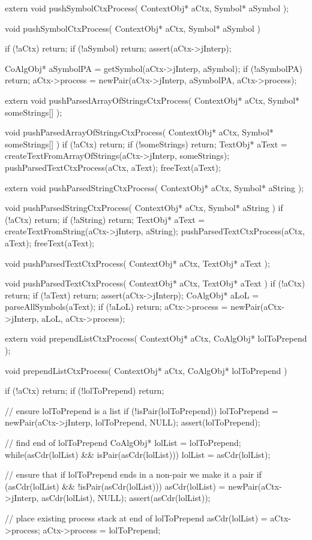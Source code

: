 \startCHeader
extern void pushSymbolCtxProcess(
  ContextObj* aCtx,
  Symbol* aSymbol
);
\stopCHeader

\startCCode
void pushSymbolCtxProcess(
  ContextObj* aCtx,
  Symbol* aSymbol
) {
  if (!aCtx) return;
  if (!aSymbol) return;
  assert(aCtx->jInterp);

  CoAlgObj* aSymbolPA =
    getSymbol(aCtx->jInterp, aSymbol);
  if (!aSymbolPA) return;
  aCtx->process = newPair(aCtx->jInterp, aSymbolPA, aCtx->process);
}
\stopCCode

\startCHeader
extern void pushParsedArrayOfStringsCtxProcess(
  ContextObj* aCtx,
  Symbol* someStrings[]
);
\stopCHeader

\startCCode
void pushParsedArrayOfStringsCtxProcess(
  ContextObj* aCtx,
  Symbol* someStrings[]
) {
  if (!aCtx) return;
  if (!someStrings) return;
  TextObj* aText =
    createTextFromArrayOfStrings(aCtx->jInterp, someStrings);
  pushParsedTextCtxProcess(aCtx, aText);
  freeText(aText);
}
\stopCCode

\startCHeader
extern void pushParsedStringCtxProcess(
  ContextObj* aCtx,
  Symbol* aString
);
\stopCHeader

\startCCode
void pushParsedStringCtxProcess(
  ContextObj* aCtx,
  Symbol* aString
) {
  if (!aCtx) return;
  if (!aString) return;
  TextObj* aText =
    createTextFromString(aCtx->jInterp, aString);
  pushParsedTextCtxProcess(aCtx, aText);
  freeText(aText);
}
\stopCCode

\startCHeader
void pushParsedTextCtxProcess(
  ContextObj* aCtx,
  TextObj* aText
);
\stopCHeader

\startCCode
void pushParsedTextCtxProcess(
  ContextObj* aCtx,
  TextObj* aText
) {
  if (!aCtx) return;
  if (!aText) return;
  assert(aCtx->jInterp);
  CoAlgObj* aLoL = parseAllSymbols(aText);
  if (!aLoL) return;
  aCtx->process = newPair(aCtx->jInterp, aLoL, aCtx->process);
}
\stopCCode

\startCHeader
extern void prependListCtxProcess(
  ContextObj* aCtx,
  CoAlgObj* lolToPrepend
);
\stopCHeader

\startCCode
void prependListCtxProcess(
  ContextObj* aCtx,
  CoAlgObj* lolToPrepend
) {
  if (!aCtx) return;
  if (!lolToPrepend) return;

  // ensure lolToPrepend is a list
  if (!isPair(lolToPrepend)) {
    lolToPrepend = newPair(aCtx->jInterp, lolToPrepend, NULL);
    assert(lolToPrepend);
  }

  // find end of lolToPrepend
  CoAlgObj* lolList = lolToPrepend;
  while(asCdr(lolList) && isPair(asCdr(lolList))) {
    lolList = asCdr(lolList);
  }

  // ensure that if lolToPrepend ends in a non-pair we make it a pair
  if (asCdr(lolList) && !isPair(asCdr(lolList))) {
    asCdr(lolList) = newPair(aCtx->jInterp, asCdr(lolList), NULL);
    assert(asCdr(lolList));
  }

  // place existing process stack at end of lolToPrepend
  asCdr(lolList)  = aCtx->process;
  aCtx->process   = lolToPrepend;
}
\stopCCode

